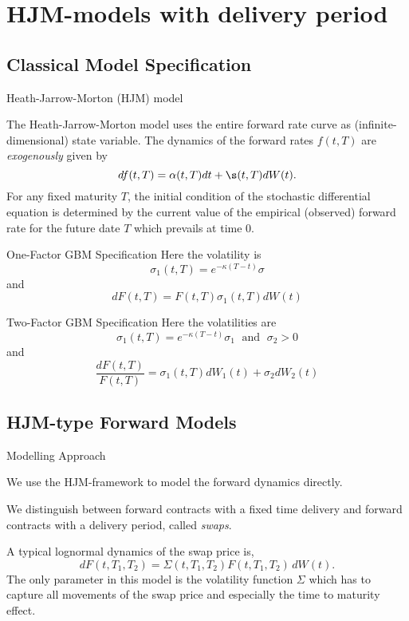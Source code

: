 \section{HJM-models with delivery period}
\subsection{Classical Model Specification}


{ Heath-Jarrow-Morton (HJM) model}

The Heath-Jarrow-Morton model uses the entire forward rate curve as
(infinite-dimensional) state variable. The dynamics of the forward rates $f(t,T)$ are {\it exogenously} given by
$$
df(t,T) = \alpha(t,T) dt + \s(t,T) dW(t).
$$
For any fixed maturity $T$, the
initial condition of the stochastic differential equation
is determined by the current value
of the empirical (observed) forward rate for the future date $T$
which prevails at time $0$.






{One-Factor GBM Specification}
Here the volatility is
$$
\sigma_1(t,T)=e^{-\kappa (T-t)}\sigma
$$
and
$$
dF(t,T)=F(t,T)\sigma_1(t,T)dW(t)
$$



{Two-Factor GBM Specification}
Here the volatilities are
$$
\sigma_1(t,T)=e^{-\kappa (T-t)}\sigma_1 \; \mbox{ and } \; \sigma_2>0
$$
and
$$
\frac{dF(t,T)}{F(t,T)}=\sigma_1(t,T)dW_1(t)+\sigma_2dW_2(t)
$$


\subsection{HJM-type Forward Models}

{Modelling Approach}






	We use the HJM-framework to model the forward dynamics directly.


	We distinguish between forward contracts with a fixed time delivery and forward contracts with a delivery period, called \emph{swaps}.


	A typical lognormal dynamics of the swap price is,
\begin{equation}
dF(t,T_1,T_2)=\Sigma(t,T_1,T_2)F(t,T_1,T_2)\, dW(t). \label{eqn: lognormal dynamics}
\end{equation}
The only parameter in this model is the volatility function $\Sigma$ which has to capture all movements of the swap price and especially the time to maturity effect.




